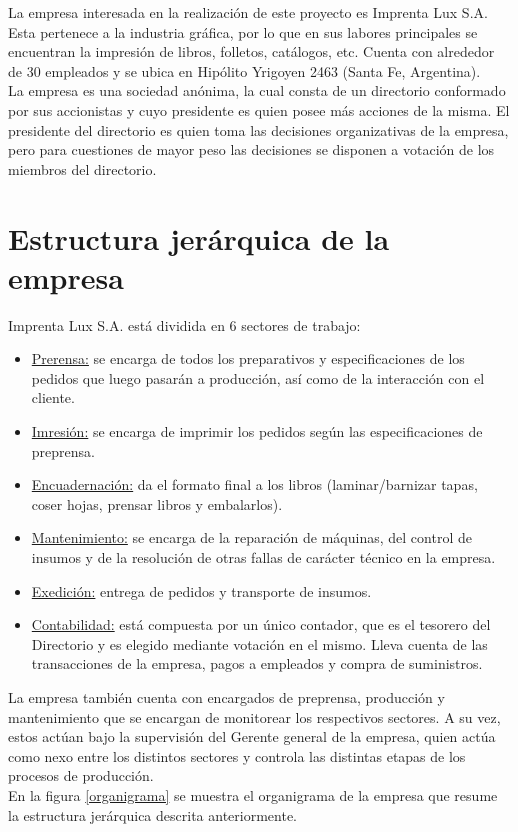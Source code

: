 \documentclass[a4paper, 12pt,twoside]{report}  %
\numberwithin{equation}{subsection} %
\begin{document}
La empresa interesada en la realización de este proyecto es Imprenta Lux S.A. Esta pertenece a la industria gráfica, por lo que en sus labores principales se encuentran la impresión de libros, folletos, catálogos, etc. Cuenta con alrededor de 30
empleados y se ubica en Hipólito Yrigoyen 2463 (Santa Fe, Argentina).\\
\indent La empresa es una sociedad anónima, la cual consta de un directorio conformado por sus
accionistas y cuyo presidente es quien posee más acciones de la
misma. El presidente del directorio es quien toma las decisiones organizativas de la empresa, pero para cuestiones de mayor peso las decisiones se disponen a votación de los miembros del directorio.

\section{Estructura jerárquica de la empresa}

Imprenta Lux S.A. está dividida en 6 sectores de trabajo:
\begin{itemize}
\item \underline{Prerensa:} se encarga de todos los preparativos y especificaciones de los pedidos que luego pasarán a producción, así como de la interacción con el cliente.
\item \underline{Imresión:} se encarga de imprimir los pedidos según las especificaciones de preprensa.
\item \underline{Encuadernación:} da el formato final a los libros (laminar/barnizar tapas, coser hojas, prensar libros y embalarlos).
\item \underline{Mantenimiento:} se encarga de la reparación de máquinas, del control de insumos y de la resolución de otras fallas de carácter técnico en la empresa.
\item \underline{Exedición:} entrega de pedidos y transporte de insumos.
\item \underline{Contabilidad:} está compuesta por un único contador, que es el tesorero del Directorio y es elegido mediante votación en el mismo. Lleva cuenta de las transacciones de la empresa, pagos a empleados y compra de suministros.
\end{itemize}
\indent La empresa también cuenta con encargados de preprensa, producción y mantenimiento que se
encargan de monitorear los respectivos sectores. A su vez, estos actúan bajo la supervisión del
Gerente general de la empresa, quien actúa como nexo entre los distintos sectores y controla las
distintas etapas de los procesos de producción.\\
\indent En la figura \ref{organigrama} se muestra el organigrama de la empresa que resume la estructura jerárquica descrita anteriormente.
\end{document}

